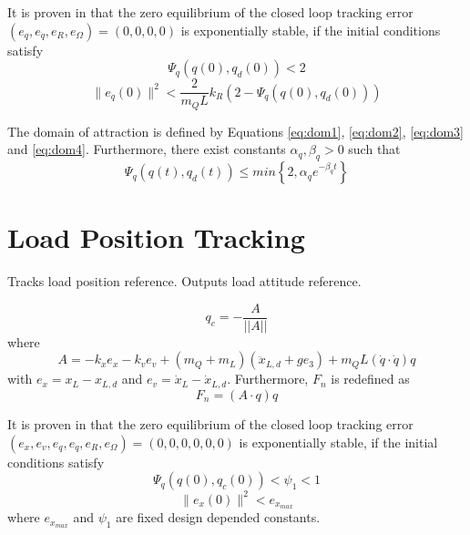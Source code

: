 It is proven in \cite{Sreenath2013c} that the zero equilibrium of the closed loop tracking error $ (e_q,e_{\dot{q}},e_R,e_\Omega)=(0,0,0,0) $ is exponentially stable, if the initial conditions satisfy
\begin{equation}\label{eq:dom3}
\Psi_q(q(0),q_d(0))<2
\end{equation}
\begin{equation}\label{eq:dom4}
\parallel e_{\dot{q}}(0)\parallel^2<\frac{2}{m_QL}{k_R}(2-\Psi_q(q(0),q_d(0)))
\end{equation}

The domain of attraction is defined by Equations \ref{eq:dom1}, \ref{eq:dom2}, \ref{eq:dom3} and \ref{eq:dom4}.
Furthermore, there exist constants $ \alpha_q,\beta_q>0 $ such that
\begin{equation}\label{eq:con.Psiqconv}
\Psi_q(q(t),q_d(t)) \leq min\left\lbrace 2,\alpha_qe^{-\beta_qt}\right\rbrace 
\end{equation}

\section{Load Position Tracking}\label{sec:con.loadpos}


Tracks load position reference. Outputs load attitude reference.

\begin{equation}\label{eq:con.q}
q_c = - \frac{A}{||A||}
\end{equation}
where
\begin{equation}\label{key}
A = -k_xe_x-k_ve_v+(m_Q+m_L)(\ddot{x}_{L,d}+ge_3)+m_QL(\dot{q}\cdot\dot{q})q
\end{equation}
with $ e_x=x_L-x_{L,d} $ and $ e_v=\dot{x}_L-\dot{x}_{L,d} $.
Furthermore, $ F_n $ is redefined as
\begin{equation}\label{key}
F_n=(A\cdot q)q
\end{equation}

It is proven in \cite{Sreenath2013c} that the zero equilibrium of the closed loop tracking error $ (e_x,e_v,e_q,e_{\dot{q}},e_R,e_\Omega)=(0,0,0,0,0,0) $ is exponentially stable, if the initial conditions satisfy
\begin{equation}\label{eq:dom5}
\Psi_q(q(0),q_c(0))<\psi_1<1
\end{equation}
\begin{equation}
\parallel e_{x}(0)\parallel^2<e_{x_{max}}
\end{equation}
where $ e_{x_{max}} $ and $ \psi_1 $ are fixed design depended constants. 

